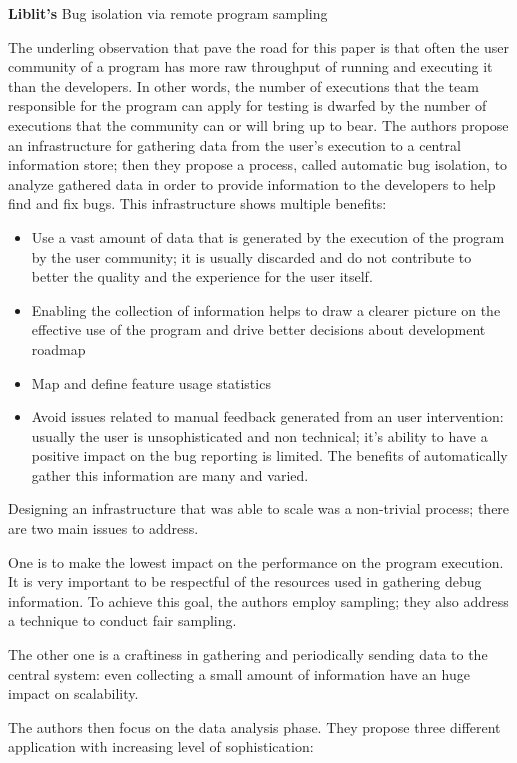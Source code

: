 \noindent \textbf{Liblit's} \cite{liblit2003bug} Bug isolation via remote program sampling

The underling observation that pave the road for this paper is that often the user community of a program has more raw throughput of running and executing it than the developers. In other words, the number of executions that the team responsible for the program can apply for testing is dwarfed by the number of executions that the community can or will bring up to bear.
The authors propose an infrastructure for gathering data from the user's execution to a central information store; then they propose a process, called automatic bug isolation, to analyze gathered data in order to provide information to the developers to help find and fix bugs.
This infrastructure shows multiple benefits:

\begin{itemize} 
\item Use a vast amount of data that is generated by the execution of the program by the user community; it is usually discarded and do not contribute to better the quality and the experience for the user itself.
\item Enabling the collection of information helps to draw a clearer picture on the effective use of the program and drive better decisions about development roadmap
\item Map and define feature usage statistics
\item Avoid issues related to manual feedback generated from an user intervention: usually the user is unsophisticated and non technical; it's ability to have a positive impact on the bug reporting is limited. The benefits of automatically gather this information are many and varied.
\end{itemize}

Designing an infrastructure that was able to scale was a non-trivial process; there are two main issues to address.

One is to make the lowest impact on the performance on the program execution. It is very important to be respectful of the resources used in gathering debug information. To achieve this goal, the authors employ sampling; they also address a technique to conduct fair sampling.

The other one is a craftiness in gathering and periodically sending data to the central system: even collecting a small amount of information have an huge impact on scalability.

The authors then focus on the data analysis phase. They propose three different application with increasing level of sophistication:

